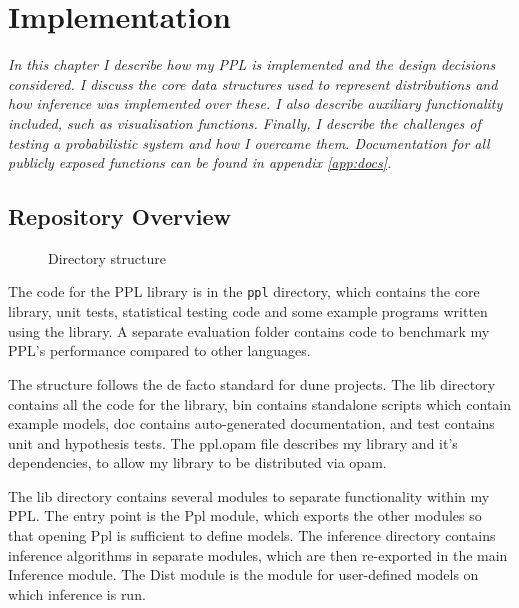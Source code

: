 \chapter{Implementation}
\textit{In this chapter I describe how my PPL is implemented and the design decisions considered. I discuss the core data structures used to represent distributions and how inference was implemented over these. I also describe auxiliary functionality included, such as visualisation functions. Finally, I describe the challenges of testing a probabilistic system and how I overcame them. Documentation for all publicly exposed functions can be found in appendix \ref{app:docs}.}

\section{Repository Overview}

\begin{figure}
	\caption{Directory structure}
	\label{fig:dirs}
\end{figure}

The code for the PPL library is in the \texttt{ppl} directory, which contains the core library, unit tests, statistical testing code and some example programs written using the library. A separate evaluation folder contains code to benchmark my PPL's performance compared to other languages.

The structure follows the de facto standard for dune projects. The lib directory contains all the code for the library, bin contains standalone scripts which contain example models, doc contains auto-generated documentation, and test contains unit and hypothesis tests. The ppl.opam file describes my library and it's dependencies, to allow my library to be distributed via opam.

The lib directory contains several modules to separate functionality within my PPL. The entry point is the Ppl module, which exports the other modules so that opening Ppl is sufficient to define models. The inference directory contains inference algorithms in separate modules, which are then re-exported in the main Inference module. The Dist module is the module for user-defined models on which inference is run. 

